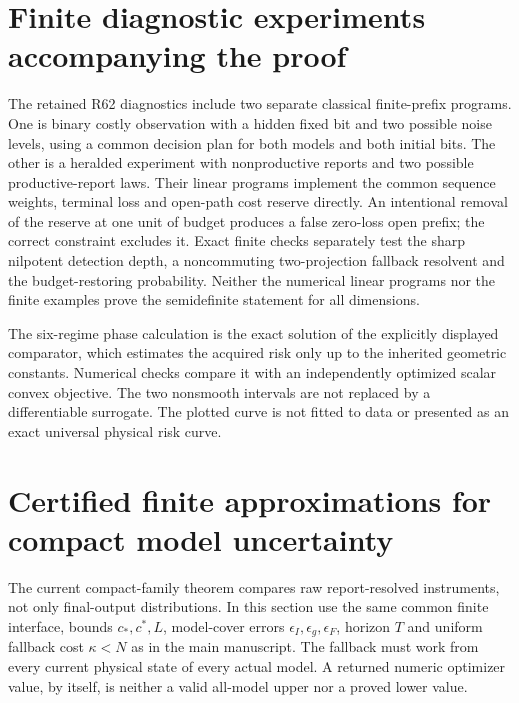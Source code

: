 \section{Finite diagnostic experiments accompanying the proof}
The retained R62 diagnostics include two separate classical finite-prefix programs. One is binary costly observation with a hidden fixed bit and two possible noise levels, using a common decision plan for both models and both initial bits. The other is a heralded experiment with nonproductive reports and two possible productive-report laws. Their linear programs implement the common sequence weights, terminal loss and open-path cost reserve directly. An intentional removal of the reserve at one unit of budget produces a false zero-loss open prefix; the correct constraint excludes it. Exact finite checks separately test the sharp nilpotent detection depth, a noncommuting two-projection fallback resolvent and the budget-restoring probability. Neither the numerical linear programs nor the finite examples prove the semidefinite statement for all dimensions.

The six-regime phase calculation is the exact solution of the explicitly displayed comparator, which estimates the acquired risk only up to the inherited geometric constants. Numerical checks compare it with an independently optimized scalar convex objective. The two nonsmooth intervals are not replaced by a differentiable surrogate. The plotted curve is not fitted to data or presented as an exact universal physical risk curve.


\section{Certified finite approximations for compact model uncertainty}
The current compact-family theorem compares raw report-resolved instruments, not only final-output distributions. In this section use the same common finite interface, bounds $c_*,c^*,L$, model-cover errors $\epsilon_I,\epsilon_g,\epsilon_F$, horizon $T$ and uniform fallback cost $\kappa<N$ as in the main manuscript. The fallback must work from every current physical state of every actual model. A returned numeric optimizer value, by itself, is neither a valid all-model upper nor a proved lower value.

